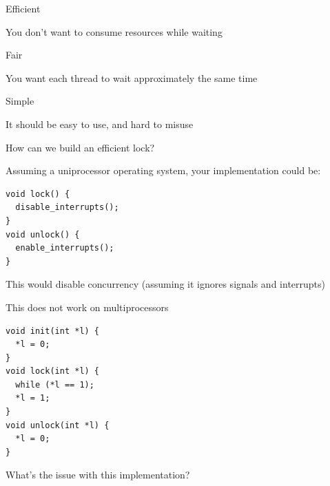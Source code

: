   \begin{slide}


    Efficient

    \leftspace{}You don't want to consume resources while waiting
    \medskip

    Fair

    \leftspace{}You want each thread to wait approximately the same time
    \medskip

    Simple

    \leftspace{}It should be easy to use, and hard to misuse

  \end{slide}

	\begin{slide}
	
		
		How can we build an efficient lock?
		
	\end{slide}
	
  \begin{slide}


    Assuming a uniprocessor operating system, your implementation could be:
    \medskip

    \begin{verbatim}
void lock() {
  disable_interrupts();
}
void unlock() {
  enable_interrupts();
}   
    \end{verbatim}
    \medskip

    This would disable concurrency (assuming it ignores signals and interrupts)

    \leftspace{}This does not work on multiprocessors

  \end{slide}

  \begin{slide}


    \begin{verbatim}
void init(int *l) {
  *l = 0;
}
void lock(int *l) {
  while (*l == 1);
  *l = 1;
}
void unlock(int *l) {
  *l = 0;
}   
    \end{verbatim}
    \medskip

    What's the issue with this implementation?



  \end{slide}

